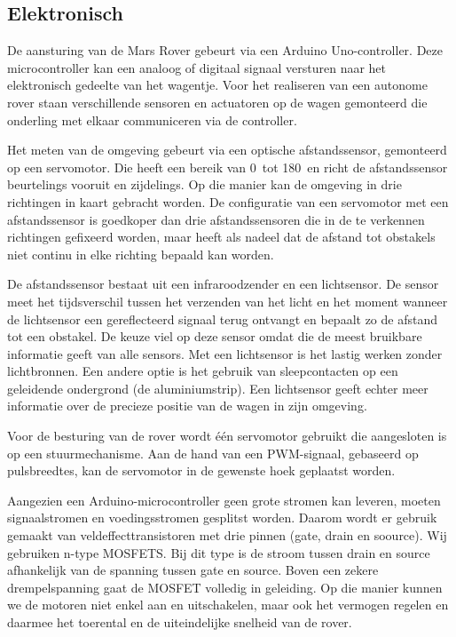  
\subsection{Elektronisch}
De aansturing van de Mars Rover gebeurt via een Arduino Uno-controller. Deze 
microcontroller kan een analoog of digitaal signaal versturen naar het 
elektronisch gedeelte van het wagentje. Voor het realiseren van een autonome 
rover staan verschillende sensoren en actuatoren op de wagen gemonteerd die 
onderling met elkaar communiceren via de controller.

Het meten van de omgeving gebeurt via een optische afstandssensor, gemonteerd op 
een servomotor. Die heeft een bereik van 0\degree~tot 180\degree~en richt de afstandssensor 
beurtelings vooruit en zijdelings. Op die manier kan de omgeving in drie 
richtingen in kaart gebracht worden. De configuratie van een servomotor met een 
afstandssensor is goedkoper dan drie afstandssensoren die in de te verkennen 
richtingen gefixeerd worden, maar heeft als nadeel dat de afstand tot obstakels 
niet continu in elke richting bepaald kan worden.

De afstandssensor bestaat uit een infraroodzender en een lichtsensor. De sensor 
meet het tijdsverschil tussen het verzenden van het licht en het moment wanneer 
de lichtsensor een gereflecteerd signaal terug ontvangt en bepaalt zo de afstand 
tot een obstakel.\cite{SharpDistanceSensor} De keuze viel op deze sensor omdat die de meest bruikbare 
informatie geeft van alle sensors. Met een lichtsensor is het lastig werken 
zonder lichtbronnen. Een andere optie is het gebruik van sleepcontacten op een geleidende ondergrond (de aluminiumstrip). Een lichtsensor geeft echter meer informatie over de precieze positie van de wagen in zijn omgeving.

Voor de besturing van de rover wordt één servomotor gebruikt die aangesloten is 
op een stuurmechanisme. Aan de hand van een PWM-signaal, gebaseerd op 
pulsbreedtes, kan de servomotor in de gewenste hoek geplaatst worden.

Aangezien een Arduino-microcontroller geen grote stromen kan leveren, moeten signaalstromen en voedingsstromen gesplitst worden. Daarom wordt er gebruik gemaakt van veldeffecttransistoren met drie pinnen (gate, drain en soource). Wij gebruiken n-type MOSFETS. Bij dit type is de stroom tussen drain en source afhankelijk van de spanning tussen gate en source. 
Boven een zekere drempelspanning gaat de MOSFET volledig in geleiding. Op die manier kunnen we de motoren niet enkel aan en uitschakelen, maar ook het vermogen regelen en daarmee het toerental en de uiteindelijke snelheid van de rover.\cite{MosfetBitwizard} 

